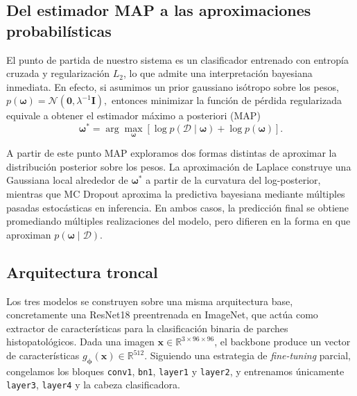 \documentclass{article}
\begin{document}
\subsection{Del estimador MAP a las aproximaciones probabil\'isticas}
\label{sec:map-to-bayes}

El punto de partida de nuestro sistema es un clasificador entrenado con
entrop\'ia cruzada y regularizaci\'on $L_2$, lo que admite una
interpretaci\'on bayesiana inmediata. En efecto, si asumimos un prior
gaussiano is\'otropo sobre los pesos,
\(
p(\boldsymbol{\omega})=\mathcal{N}(\mathbf{0},\lambda^{-1}\mathbf{I}),
\)
entonces minimizar la funci\'on de p\'erdida regularizada equivale a
obtener el estimador m\'aximo a posteriori (MAP)
\begin{equation}
\boldsymbol{\omega}^{*}
=
\arg\max_{\boldsymbol{\omega}}
\left[
\log p(\mathcal{D}\mid\boldsymbol{\omega})
+
\log p(\boldsymbol{\omega})
\right].
\label{eq:map-estimator}
\end{equation}

A partir de este punto MAP exploramos dos formas distintas de aproximar
la distribuci\'on posterior sobre los pesos. La aproximaci\'on de
Laplace construye una Gaussiana local alrededor de
\(\boldsymbol{\omega}^{*}\) a partir de la curvatura del log-posterior,
mientras que MC Dropout aproxima la predictiva bayesiana mediante
m\'ultiples pasadas estoc\'asticas en inferencia. En ambos casos, la
predicci\'on final se obtiene promediando m\'ultiples realizaciones del
modelo, pero difieren en la forma en que aproximan
\(p(\boldsymbol{\omega}\mid\mathcal{D})\).


\subsection{Arquitectura troncal}
\label{sec:backbone}

Los tres modelos se construyen sobre una misma arquitectura base,
concretamente una ResNet18 preentrenada en ImageNet, que act\'ua como
extractor de caracter\'isticas para la clasificaci\'on binaria de parches
histopatol\'ogicos. Dada una imagen
\(\mathbf{x}\in\mathbb{R}^{3\times 96\times 96}\), el backbone produce un
vector de caracter\'isticas \(g_{\boldsymbol{\phi}}(\mathbf{x})\in\mathbb{R}^{512}\).
Siguiendo una estrategia de \emph{fine-tuning} parcial, congelamos los
bloques \texttt{conv1}, \texttt{bn1}, \texttt{layer1} y \texttt{layer2}, y
entrenamos \'unicamente \texttt{layer3}, \texttt{layer4} y la cabeza
clasificadora.
\end{document}
